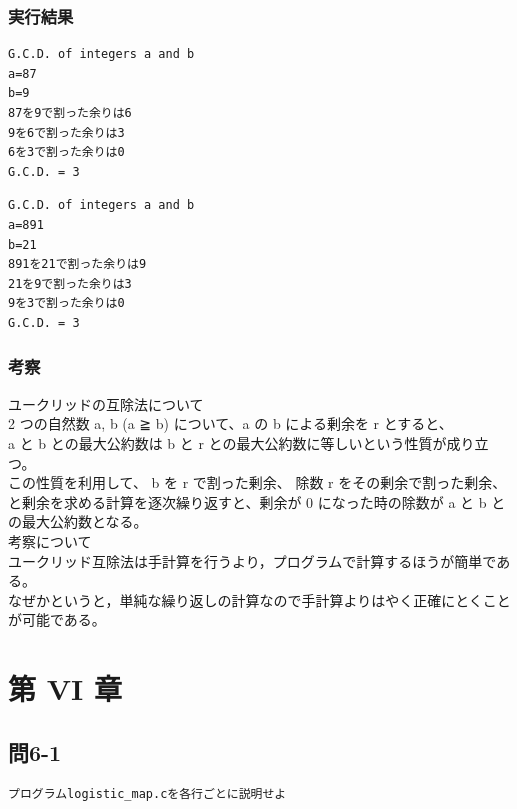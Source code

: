 \documentclass{jarticle}
\begin{document}
\subsubsection{実行結果\\}
\begin{breakbox}
\begin{verbatim}
G.C.D. of integers a and b
a=87
b=9
87を9で割った余りは6
9を6で割った余りは3
6を3で割った余りは0
G.C.D. = 3
\end{verbatim}
\end{breakbox}
\begin{breakbox}
\begin{verbatim}
G.C.D. of integers a and b
a=891
b=21
891を21で割った余りは9
21を9で割った余りは3
9を3で割った余りは0
G.C.D. = 3
\end{verbatim}
\end{breakbox}
\subsubsection{考察\\}
ユークリッドの互除法について\\
2 つの自然数 a, b (a ≧ b) について、a の b による剰余を r とすると、\\ 
a と b との最大公約数は b と r との最大公約数に等しいという性質が成り立つ。\\
この性質を利用して、 b を r で割った剰余、 除数 r をその剰余で割った剰余、\\
と剰余を求める計算を逐次繰り返すと、剰余が 0 になった時の除数が a と b との最大公約数となる。\\
考察について\\
ユークリッド互除法は手計算を行うより，プログラムで計算するほうが簡単である。\\
なぜかというと，単純な繰り返しの計算なので手計算よりはやく正確にとくことが可能である。\\


\section{第 VI 章\\}
\subsection{問6-1\\}
\begin{verbatim}
プログラムlogistic_map.cを各行ごとに説明せよ
\end{verbatim}
\end{document}
